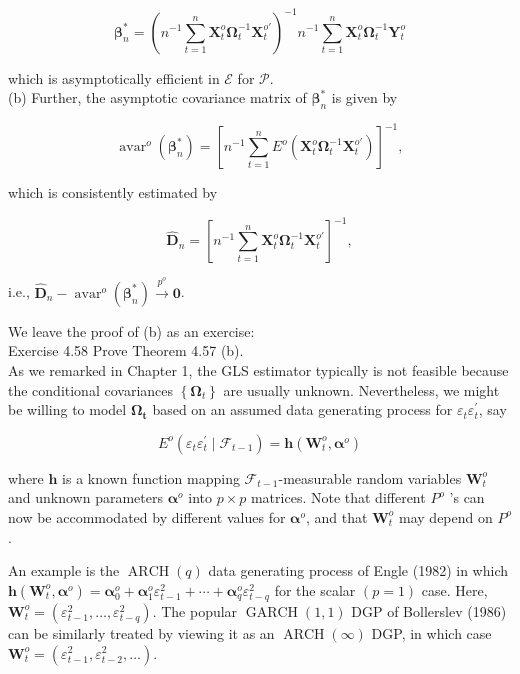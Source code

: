 \documentclass[10pt]{article}
\begin{document}
$$
\boldsymbol{\beta}_{n}^{*}=\left(n^{-1} \sum_{t=1}^{n} \mathbf{X}_{t}^{o} \boldsymbol{\Omega}_{t}^{-1} \mathbf{X}_{t}^{o \prime}\right)^{-1} n^{-1} \sum_{t=1}^{n} \mathbf{X}_{t}^{o} \boldsymbol{\Omega}_{t}^{-1} \mathbf{Y}_{t}^{o}
$$

which is asymptotically efficient in $\mathcal{E}$ for $\mathcal{P}$.\\
(b) Further, the asymptotic covariance matrix of $\boldsymbol{\beta}_{n}^{*}$ is given by

$$
\operatorname{avar}^{o}\left(\boldsymbol{\beta}_{n}^{*}\right)=\left[n^{-1} \sum_{t=1}^{n} E^{o}\left(\mathbf{X}_{t}^{o} \boldsymbol{\Omega}_{t}^{-1} \mathbf{X}_{t}^{o \prime}\right)\right]^{-1},
$$

which is consistently estimated by

$$
\hat{\mathbf{D}}_{n}=\left[n^{-1} \sum_{t=1}^{n} \mathbf{X}_{t}^{o} \boldsymbol{\Omega}_{t}^{-1} \mathbf{X}_{t}^{o \prime}\right]^{-1},
$$

i.e., $\hat{\mathbf{D}}_{n}-\operatorname{avar}^{o}\left(\boldsymbol{\beta}_{n}^{*}\right) \xrightarrow{p^{o}} \mathbf{0}$.

We leave the proof of (b) as an exercise:\\
Exercise 4.58 Prove Theorem 4.57 (b).\\
As we remarked in Chapter 1, the GLS estimator typically is not feasible because the conditional covariances $\left\{\boldsymbol{\Omega}_{t}\right\}$ are usually unknown. Nevertheless, we might be willing to model $\boldsymbol{\Omega}_{\boldsymbol{t}}$ based on an assumed data generating process for $\varepsilon_{t} \varepsilon_{t}^{\prime}$, say

$$
E^{o}\left(\varepsilon_{t} \varepsilon_{t}^{\prime} \mid \mathcal{F}_{t-1}\right)=\mathbf{h}\left(\mathbf{W}_{t}^{o}, \boldsymbol{\alpha}^{o}\right)
$$

where $\mathbf{h}$ is a known function mapping $\mathcal{F}_{t-1}$-measurable random variables $\mathbf{W}_{t}^{o}$ and unknown parameters $\boldsymbol{\alpha}^{o}$ into $p \times p$ matrices. Note that different $P^{o}$ 's can now be accommodated by different values for $\boldsymbol{\alpha}^{o}$, and that $\mathbf{W}_{t}^{o}$ may depend on $P^{o}$.

An example is the $\operatorname{ARCH}(q)$ data generating process of Engle (1982) in which $\mathbf{h}\left(\mathbf{W}_{t}^{o}, \boldsymbol{\alpha}^{o}\right)=\boldsymbol{\alpha}_{0}^{o}+\boldsymbol{\alpha}_{1}^{o} \varepsilon_{t-1}^{2}+\cdots+\boldsymbol{\alpha}_{q}^{o} \varepsilon_{t-q}^{2}$ for the scalar $(p=1)$ case. Here, $\mathbf{W}_{t}^{o}=\left(\varepsilon_{t-1}^{2}, \ldots, \varepsilon_{t-q}^{2}\right)$. The popular $\operatorname{GARCH}(1,1)$ DGP of Bollerslev (1986) can be similarly treated by viewing it as an $\operatorname{ARCH}(\infty)$ DGP, in which case $\mathbf{W}_{t}^{o}=\left(\varepsilon_{t-1}^{2}, \varepsilon_{t-2}^{2}, \ldots\right)$.
\end{document}
